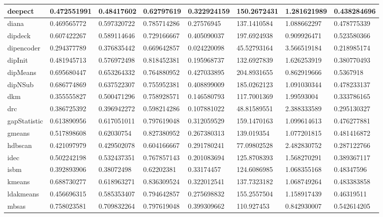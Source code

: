 \begin{table}[H]
\begin{tabular}{|l|l|l|l|l|l|l|l|}
\hline
deepect & 0.472551991 & 0.48417602 & 0.62797619 & 0.322924159 & 150.2672431 & 1.281621989 & 0.438284696 \\
\hline
diana & 0.469565772 & 0.597320722 & 0.785714286 & 0.27576945 & 137.1410584 & 1.088662297 & 0.478775339 \\
\hline
dipdeck & 0.607422267 & 0.589114646 & 0.729166667 & 0.405090037 & 197.6924938 & 0.909926471 & 0.523580366 \\
\hline
dipencoder & 0.294377789 & 0.376835442 & 0.669642857 & 0.024220098 & 45.52793164 & 3.566519184 & 0.218985174 \\
\hline
dipInit & 0.481945713 & 0.576972498 & 0.818452381 & 0.195968737 & 132.6927839 & 1.626253919 & 0.380770493 \\
\hline
dipMeans & 0.695680447 & 0.653264332 & 0.764880952 & 0.427033895 & 204.8931655 & 0.862919666 & 0.5367918 \\
\hline
dipNSub & 0.686774869 & 0.637522307 & 0.755952381 & 0.408899009 & 185.0262123 & 1.091030344 & 0.478233137 \\
\hline
dkm & 0.355555827 & 0.500471296 & 0.758928571 & 0.146580793 & 117.7001369 & 1.99593004 & 0.333786165 \\
\hline
drc & 0.386725392 & 0.396942272 & 0.598214286 & 0.107881022 & 48.81589551 & 2.388333589 & 0.295130327 \\
\hline
gapStatistic & 0.613890956 & 0.617051011 & 0.797619048 & 0.312059529 & 159.1470163 & 1.099614613 & 0.476277881 \\
\hline
gmeans & 0.517898608 & 0.62030754 & 0.827380952 & 0.267380313 & 139.019354 & 1.077201815 & 0.481416872 \\
\hline
hdbscan & 0.421097979 & 0.429502078 & 0.604166667 & 0.291780241 & 77.09802528 & 2.482830752 & 0.287122766 \\
\hline
idec & 0.502242198 & 0.532437351 & 0.767857143 & 0.201083694 & 125.8708393 & 1.568270291 & 0.389367117 \\
\hline
isbm & 0.392893906 & 0.38072498 & 0.62202381 & 0.33174457 & 124.6086985 & 1.068355168 & 0.48347596 \\
\hline
kmeans & 0.688730277 & 0.618963271 & 0.836309524 & 0.322012541 & 137.7323182 & 1.068749264 & 0.483383858 \\
\hline
ldakmeans & 0.456696315 & 0.585353407 & 0.794642857 & 0.275698832 & 155.2557504 & 1.158917439 & 0.46319511 \\
\hline
mbsas & 0.758023581 & 0.709832264 & 0.797619048 & 0.399309662 & 110.927453 & 0.842930007 & 0.542614205 \\

\end{tabular}
\end{table}
